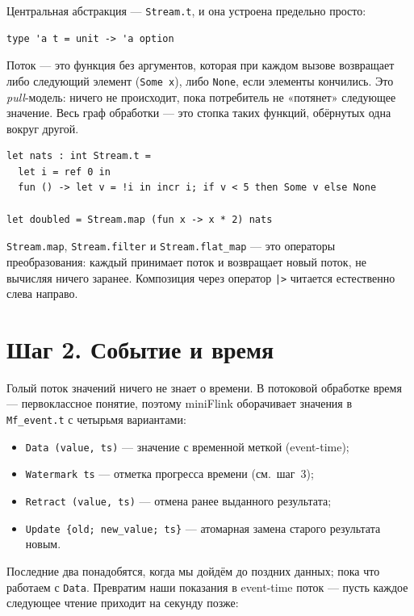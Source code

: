 \documentclass[11pt,a4paper]{article}
\begin{document}
Центральная абстракция --- \texttt{Stream.t}, и она устроена предельно
просто:

\begin{lstlisting}
type 'a t = unit -> 'a option
\end{lstlisting}

Поток --- это функция без аргументов, которая при каждом вызове
возвращает либо следующий элемент (\texttt{Some x}), либо
\texttt{None}, если элементы кончились. Это \emph{pull}-модель:
ничего не происходит, пока потребитель не «потянет» следующее
значение. Весь граф обработки --- это стопка таких функций, обёрнутых
одна вокруг другой.

\begin{lstlisting}
let nats : int Stream.t =
  let i = ref 0 in
  fun () -> let v = !i in incr i; if v < 5 then Some v else None

let doubled = Stream.map (fun x -> x * 2) nats
\end{lstlisting}

\texttt{Stream.map}, \texttt{Stream.filter} и \texttt{Stream.flat\_map}
--- это операторы преобразования: каждый принимает поток и возвращает
новый поток, не вычисляя ничего заранее. Композиция через оператор
\texttt{|>} читается естественно слева направо.

\section{Шаг 2. Событие и время}

Голый поток значений ничего не знает о времени. В потоковой обработке
время --- первоклассное понятие, поэтому miniFlink оборачивает значения
в \texttt{Mf\_event.t} с четырьмя вариантами:

\begin{itemize}
\item \texttt{Data (value, ts)} --- значение с временной меткой
  (event-time);
\item \texttt{Watermark ts} --- отметка прогресса времени (см.\ шаг~3);
\item \texttt{Retract (value, ts)} --- отмена ранее выданного
  результата;
\item \texttt{Update \{old; new\_value; ts\}} --- атомарная замена
  старого результата новым.
\end{itemize}

Последние два понадобятся, когда мы дойдём до поздних данных; пока что
работаем с \texttt{Data}. Превратим наши показания в event-time поток
--- пусть каждое следующее чтение приходит на секунду позже:
\end{document}
